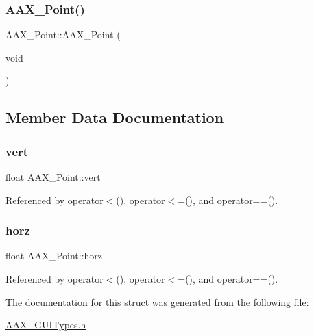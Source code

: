 \mbox{\label{a01609_a8f6d76eefb8ebc2e511c8e548d0b4c13}} 
\subsubsection{\texorpdfstring{AAX\_Point()}{AAX\_Point()}\hspace{0.1cm}{\footnotesize\ttfamily [2/2]}}
{\footnotesize\ttfamily A\+A\+X\+\_\+\+Point\+::\+A\+A\+X\+\_\+\+Point (\begin{DoxyParamCaption}\item[{void}]{ }\end{DoxyParamCaption})\hspace{0.3cm}{\ttfamily [inline]}}



\subsection{Member Data Documentation}
\mbox{\label{a01609_a63dc61a7272f2af67a3a75c438afa39a}} 
\subsubsection{\texorpdfstring{vert}{vert}}
{\footnotesize\ttfamily float A\+A\+X\+\_\+\+Point\+::vert}



Referenced by operator$<$(), operator$<$=(), and operator==().

\mbox{\label{a01609_ac4f9194d96ae6a2547194139a5f6abb2}} 
\subsubsection{\texorpdfstring{horz}{horz}}
{\footnotesize\ttfamily float A\+A\+X\+\_\+\+Point\+::horz}



Referenced by operator$<$(), operator$<$=(), and operator==().



The documentation for this struct was generated from the following file\+:\begin{DoxyCompactItemize}
\item 
\mbox{\hyperlink{a00503}{A\+A\+X\+\_\+\+G\+U\+I\+Types.\+h}}\end{DoxyCompactItemize}
